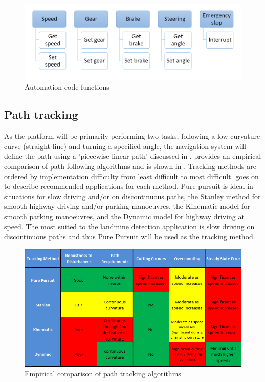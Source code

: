 \documentclass[main.tex]{subfiles}
\begin{document}
\begin{figure}[ht]
\includegraphics[width=\textwidth]{3-ConceptDesign/autofunct.PNG}
\centering
\caption{Automation code functions} 
\end{figure}

\subsection{Path tracking}
As the platform will be primarily performing two tasks, following a low curvature curve (straight line) and turning a specified angle, the navigation system will define the path using a 'piecewise linear path' discussed in . \Textcite{snider2009} provides an empirical comparison of path following algorithms and is shown in . Tracking methods are ordered by implementation difficulty from least difficult to most difficult. \Textcite{snider2009} goes on to describe recommended applications for each method.  Pure pursuit is ideal in situations for slow driving and/or on discontinuous paths, the Stanley method for smooth highway driving and/or parking manoeuvres, the Kinematic model for smooth parking manoeuvres, and the Dynamic model for highway driving at speed. The most suited to the landmine detection application is slow driving on discontinuous paths and thus Pure Pursuit will be used as the tracking method.
\begin{figure}[ht]
\includegraphics[width = \textwidth]{3-ConceptDesign/pathTrackingSummary2.png}
\centering
\caption[Empirical comparison of path tracking algorithms]{Empirical comparison of path tracking algorithms \parencite{snider2009}} 
\end{figure}
\end{document}

